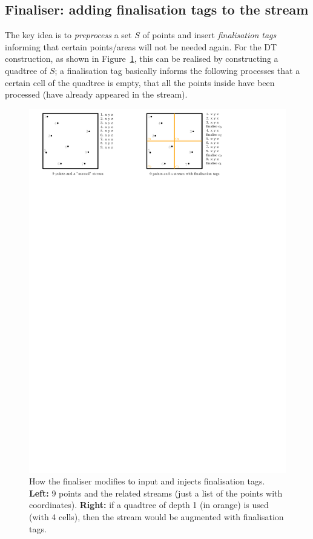 \subsection{Finaliser: adding finalisation tags to the stream}
The key idea is to \emph{preprocess} a set $S$ of points and insert \emph{finalisation tags} informing that certain points/areas will not be needed again.
For the DT construction, as shown in Figure~\ref{fig:finaliser}, this can be realised by constructing a quadtree of $S$; a finalisation tag basically informs the following processes that a certain cell of the quadtree is empty, that all the points inside have been processed (have already appeared in the stream).
\begin{figure}
  \centering
  \includegraphics[width=\linewidth]{figs/finaliser}
  \caption{How the finaliser modifies to input and injects finalisation tags. \textbf{Left:} 9 points and the related streams (just a list of the points with coordinates). \textbf{Right:} if a quadtree of depth 1 (in orange) is used (with 4 cells), then the stream would be augmented with finalisation tags.}%
\label{fig:finaliser}
\end{figure}


